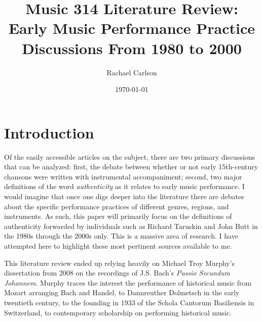 \documentclass[12pt]{article}
\author{Rachael Carlson}
\title{Music 314 Literature Review: Early Music Performance Practice Discussions From 1980 to 2000}
\date{\today}
\begin{document}
\begin{titlepage}
  \maketitle
\end{titlepage}

\section{Introduction}
\label{sec:introduction}
Of the easily accessible articles on the subject, there are two
primary discussions that can be analyzed: first, the debate between
whether or not early 15th-century chansons were written with
instrumental accompaniment; second, two major definitions of the word
\emph{authenticity} as it relates to early music performance. I would
imagine that once one digs deeper into the literature there are
debates about the specific performance practices of different genres,
regions, and instruments. As such, this paper will primarily focus on
the definitions of authenticity forwarded by individuals such as
Richard Taruskin and John Butt in the 1980s through the 2000s only.
This is a massive area of research. I have attempted here to highlight
these most pertinent sources available to me.

This literature review ended up relying heavily on Michael Troy
Murphy's dissertation from 2008 on the recordings of J.S. Bach's
\emph{Passio Secundum Johannem}.\autocite{murphy2008} Murphy traces
the interest the performance of historical music from Mozart arranging
Bach and Handel, to Dannreuther Dolmetsch in the early twentieth
century, to the founding in 1933 of the Schola Cantorum Basiliensis in
Switzerland, to contemporary scholarship on performing historical
music.\autocite[9--16]{murphy2008}


\end{document}

